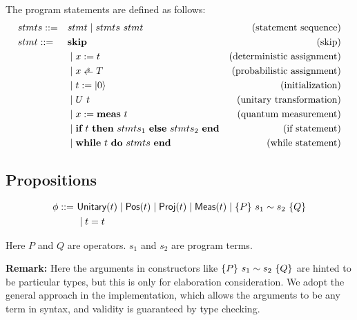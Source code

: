 \newcommand{\Skip}{\textbf{skip}}
\newcommand{\Assign}[2]{\ensuremath{#1:=#2}}
\newcommand{\pAssign}[2]{\ensuremath{#1 \rndarrow #2}}
\newcommand{\Init}[1]{\ensuremath{#1:=\ket{0}}}
\newcommand{\MeaAssign}[2]{\ensuremath{#1 := \textbf{meas}\ #2}}
\newcommand{\If}[3]{\ensuremath{
    \textbf{if}\ #1\ \textbf{then}\ #2\ \textbf{else}\ #3\ \textbf{end}
}}
\newcommand{\While}[2]{\ensuremath{
    \textbf{while}\ #1\ \textbf{do}\ #2\ \textbf{end}
}}

\begin{definition}
    \label{def: prog syntax}
    The program statements are defined as follows:
    \begin{align*}
        & stmts ::= && stmt \mid stmts\ stmt & \text{(statement sequence)} \\
        & stmt ::= && \Skip & \text{(skip)} \\
            & && \mid \Assign{x}{t} & \text{(deterministic assignment)} \\
            & && \mid \pAssign{x}{T} & \text{(probabilistic assignment)} \\
            & && \mid \Init{t} & \text{(initialization)} \\
            & && \mid U\ t & \text{(unitary transformation)} \\
            & && \mid \MeaAssign{x}{t} & \text{(quantum measurement)} \\
            & && \mid \If{t}{stmts_1}{stmts_2} & \text{(if statement)} \\
            & && \mid \While{t}{stmts} & \text{(while statement)}
    \end{align*}
\end{definition}

\subsection{Propositions}

\begin{definition}
    \label{def:prop syntax}
    \begin{align*}
        \phi ::=\ & \textsf{Unitary}({t}) \mid \textsf{Pos}({t}) \mid \textsf{Proj}({t}) \mid \textsf{Meas}(t) \mid \{P\}~s_1 \sim s_2~\{Q\} \\
                & \mid t = t
    \end{align*}
\end{definition}
Here $P$ and $Q$ are operators. $s_1$ and $s_2$ are program terms.

\textbf{Remark:} Here the arguments in constructors like $\{P\}~s_1 \sim s_2~\{Q\}$ are hinted to be particular types, but this is only for elaboration consideration. We adopt the general approach in the implementation, which allows the arguments to be any term in syntax, and validity is guaranteed by type checking.


